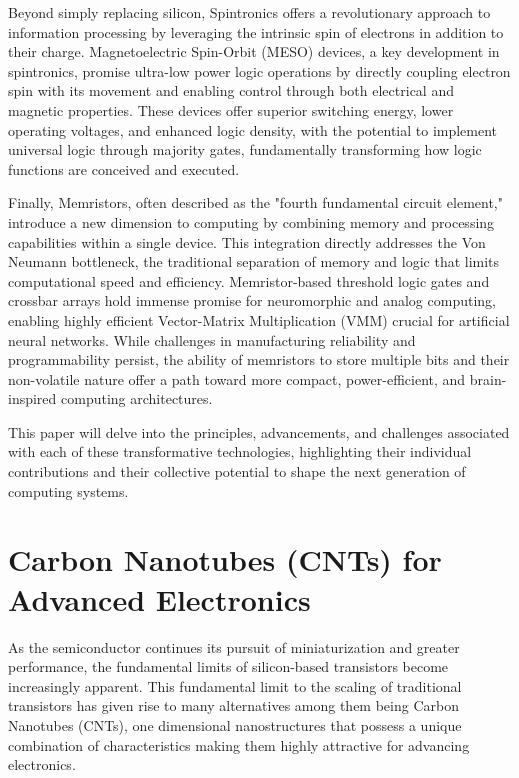\documentclass[sigconf]{acmart}
\begin{document}
Beyond simply replacing silicon, Spintronics offers a 
revolutionary approach to information processing by leveraging 
the intrinsic spin of electrons in addition to their charge. 
Magnetoelectric Spin-Orbit (MESO) devices, a key development in 
spintronics, promise ultra-low power logic operations by directly 
coupling electron spin with its movement and enabling control 
through both electrical and magnetic properties. These devices 
offer superior switching energy, lower operating voltages, and 
enhanced logic density, with the potential to implement universal 
logic through majority gates, fundamentally transforming how logic 
functions are conceived and executed.

Finally, Memristors, often described as the "fourth fundamental 
circuit element," introduce a new dimension to computing by 
combining memory and processing capabilities within a single 
device. This integration directly addresses the Von Neumann 
bottleneck, the traditional separation of memory and logic that 
limits computational speed and efficiency. Memristor-based 
threshold logic gates and crossbar arrays hold immense promise 
for neuromorphic and analog computing, enabling highly efficient 
Vector-Matrix Multiplication (VMM) crucial for artificial neural 
networks. While challenges in manufacturing reliability and 
programmability persist, the ability of memristors to store 
multiple bits and their non-volatile nature offer a path toward 
more compact, power-efficient, and brain-inspired computing 
architectures.

This paper will delve into the principles, advancements, and 
challenges associated with each of these transformative technologies, 
highlighting their individual contributions and their collective 
potential to shape the next generation of computing systems.

\section{Carbon Nanotubes (CNTs) for Advanced Electronics}
As the semiconductor continues its pursuit of miniaturization 
and greater performance, the fundamental limits of silicon-based 
transistors become increasingly apparent. This fundamental limit to 
the scaling of traditional transistors has given rise to many 
alternatives among them being Carbon Nanotubes (CNTs), one 
dimensional nanostructures that possess a unique combination of 
characteristics making them highly attractive for advancing 
electronics.
\end{document}
